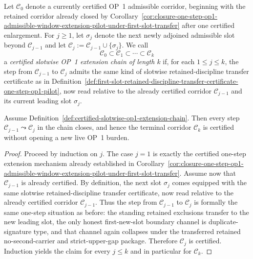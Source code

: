 \begin{definition}
\label{def:certified-slotwise-op1-extension-chain}
Let $\mathcal C_0$ denote a currently certified OP~1 admissible corridor, beginning with the retained corridor already closed by Corollary~\ref{cor:closure-one-step-op1-admissible-window-extension-pilot-under-first-slot-transfer} after one certified enlargement. For $j\ge 1$, let $\sigma_j$ denote the next newly adjoined admissible slot beyond $\mathcal C_{j-1}$ and let $\mathcal C_j:=\mathcal C_{j-1}\cup\{\sigma_j\}$. We call
\[
 \mathcal C_0\subset \mathcal C_1\subset \cdots \subset \mathcal C_k
\]
a \emph{certified slotwise OP~1 extension chain of length $k$} if, for each $1\le j\le k$, the step from $\mathcal C_{j-1}$ to $\mathcal C_j$ admits the same kind of slotwise retained-discipline transfer certificate as in Definition~\ref{def:first-slot-retained-discipline-transfer-certificate-one-step-op1-pilot}, now read relative to the already certified corridor $\mathcal C_{j-1}$ and its current leading slot $\sigma_j$.
\end{definition}

\begin{proposition}
\label{prop:slotwise-transfer-certificates-iterate-one-step-op1-extension-mechanism}
Assume Definition~\ref{def:certified-slotwise-op1-extension-chain}. Then every step $\mathcal C_{j-1}\leadsto \mathcal C_j$ in the chain closes, and hence the terminal corridor $\mathcal C_k$ is certified without opening a new live OP~1 burden.
\end{proposition}

\begin{proof}
Proceed by induction on $j$. The case $j=1$ is exactly the certified one-step extension mechanism already established in Corollary~\ref{cor:closure-one-step-op1-admissible-window-extension-pilot-under-first-slot-transfer}. Assume now that $\mathcal C_{j-1}$ is already certified. By definition, the next slot $\sigma_j$ comes equipped with the same slotwise retained-discipline transfer certificate, now read relative to the already certified corridor $\mathcal C_{j-1}$. Thus the step from $\mathcal C_{j-1}$ to $\mathcal C_j$ is formally the same one-step situation as before: the standing retained exclusions transfer to the new leading slot, the only honest first-new-slot boundary channel is duplicate-signature type, and that channel again collapses under the transferred retained no-second-carrier and strict-upper-gap package. Therefore $\mathcal C_j$ is certified. Induction yields the claim for every $j\le k$ and in particular for $\mathcal C_k$.
\end{proof}

